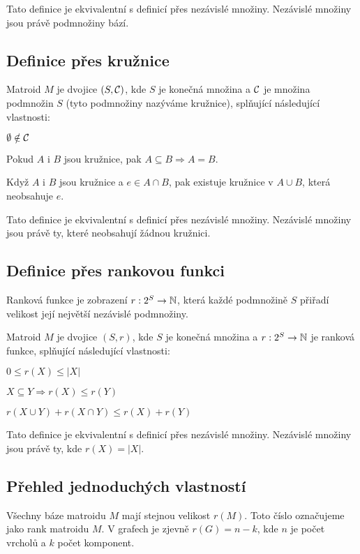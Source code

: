 \poz Tato definice je ekvivalentní s definicí přes nezávislé množiny. Nezávislé
množiny jsou právě podmnožiny bází.

\subsection{Definice přes kružnice}
\df Matroid $M$ je dvojice $(S,\mathcal{C})$, kde $S$ je konečná množina a $\mathcal{C}$ je
množina podmnožin $S$ (tyto podmnožiny nazýváme kružnice), splňující
následující vlastnosti: 
\begin{enumerate*}
\item $\emptyset \notin \mathcal{C}$
\item Pokud $A$ i $B$ jsou kružnice, pak $A\subseteq B \Rightarrow A = B$.
\item Když $A$ i $B$ jsou kružnice a $e\in A\cap B$, pak existuje kružnice v $A\cup B$, která neobsahuje $e$.
\end{enumerate*}

\poz Tato definice je ekvivalentní s definicí přes nezávislé množiny. Nezávislé
množiny jsou právě ty, které neobsahují žádnou kružnici.

\subsection{Definice přes rankovou funkci}
\df Ranková funkce je zobrazení $r: 2^S \rightarrow \mathbb{N}$, která každé podmnožině
$S$ přiřadí velikost její největší nezávislé podmnožiny.

\df Matroid $M$ je dvojice $(S,r)$, kde $S$ je konečná množina a $r: 2^S
\rightarrow \mathbb{N}$ je ranková funkce, splňující následující vlastnosti:
\begin{enumerate*}
\item $0 \le r(X) \le |X|$
\item $X\subseteq Y \Rightarrow r(X) \le r(Y)$
\item $r(X\cup Y) + r(X\cap Y) \le r(X) + r(Y)$
\end{enumerate*}

\poz Tato definice je ekvivalentní s definicí přes nezávislé množiny. Nezávislé množiny jsou právě ty, kde $r(X) = |X|$.

\subsection{Přehled jednoduchých vlastností}
\tv Všechny báze matroidu $M$ mají stejnou velikost $r(M)$. Toto číslo
označujeme jako rank matroidu $M$. V grafech je zjevně $r(G) = n-k$, kde $n$ je
počet vrcholů a $k$ počet komponent.

